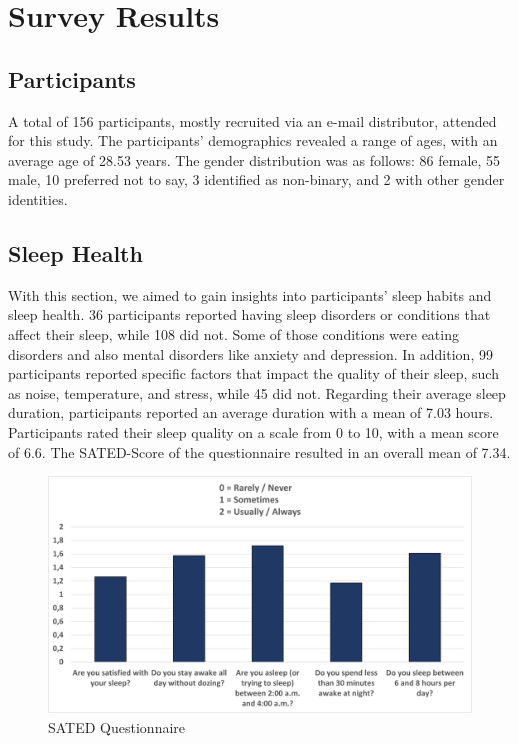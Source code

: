 \documentclass[
  a4paper,  %
  twoside,  %
  bibliography=totoc,
  headsepline,
  cleardoublepage=empty,
  parskip=half,
  draft=false
]{scrbook}
\begin{document}
\section{Survey Results}

\subsection{Participants}
A total of 156 participants, mostly recruited via an e-mail distributor, attended for this study. The participants' demographics revealed a range of ages, with an average age of 28.53 years. The gender distribution was as follows: 86 female, 55 male, 10 preferred not to say, 3 identified as non-binary, and 2 with other gender identities.


\subsection{Sleep Health}
With this section, we aimed to gain insights into participants' sleep habits and sleep health. 36 participants reported having sleep disorders or conditions that affect their sleep, while 108 did not. Some of those conditions were eating disorders and also mental disorders like anxiety and depression. In addition, 99 participants reported specific factors that impact the quality of their sleep, such as noise, temperature, and stress, while 45 did not. Regarding their average sleep duration, participants reported an average duration with a mean of 7.03 hours. Participants rated their sleep quality on a scale from 0 to 10, with a mean score of 6.6. The SATED-Score of the questionnaire resulted in an overall mean of 7.34.
\begin{figure}[H]
    \centering
    \includegraphics[scale=0.7]{graphics/SATED_Charts.png}
    \caption{SATED Questionnaire}
    \label{fig:SATED}
\end{figure}
\end{document}
